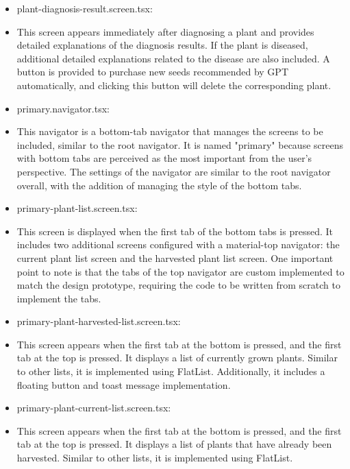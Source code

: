 \documentclass[conference, a4paper]{IEEEtran}
\begin{document}
\begin{enumerate}
\begin{enumerate}
\begin{itemize}
        \item plant-diagnosis-result.screen.tsx: 
        \item[] This screen appears immediately after diagnosing a plant and provides detailed explanations of the diagnosis results. If the plant is diseased, additional detailed explanations related to the disease are also included. A button is provided to purchase new seeds recommended by GPT automatically, and clicking this button will delete the corresponding plant. \\

        \item primary.navigator.tsx: 
        \item[] This navigator is a bottom-tab navigator that manages the screens to be included, similar to the root navigator. It is named "primary" because screens with bottom tabs are perceived as the most important from the user's perspective. The settings of the navigator are similar to the root navigator overall, with the addition of managing the style of the bottom tabs. \\

        \item primary-plant-list.screen.tsx: 
        \item[] This screen is displayed when the first tab of the bottom tabs is pressed. It includes two additional screens configured with a material-top navigator: the current plant list screen and the harvested plant list screen. One important point to note is that the tabs of the top navigator are custom implemented to match the design prototype, requiring the code to be written from scratch to implement the tabs. \\

        \item primary-plant-harvested-list.screen.tsx: 
        \item[] This screen appears when the first tab at the bottom is pressed, and the first tab at the top is pressed. It displays a list of currently grown plants. Similar to other lists, it is implemented using FlatList. Additionally, it includes a floating button and toast message implementation. \\

        \item primary-plant-current-list.screen.tsx: 
        \item[] This screen appears when the first tab at the bottom is pressed, and the first tab at the top is pressed. It displays a list of plants that have already been harvested. Similar to other lists, it is implemented using FlatList. \\


\end{itemize}
\end{enumerate}
\end{enumerate}
\end{document}
